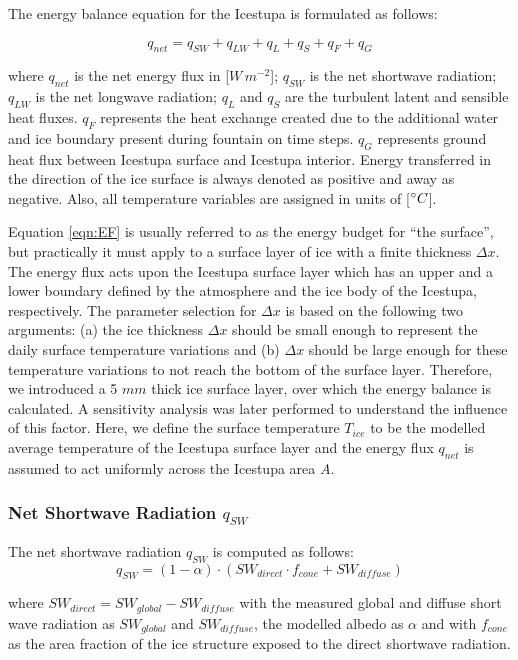 \documentclass[utf8]{frontiersSCNS} %
\begin{document}
The energy balance equation for the Icestupa is formulated as follows:

\begin{equation} q_{net} = q_{SW} + q_{LW} + q_{L} + q_{S} + q_{F} + q_{G} \label{eqn:EF} \end{equation}

where $q_{net}$ is the net energy flux in [$W\,m^{-2}$]; $q_{SW}$ is the net shortwave radiation; $q_{LW}$ is the net
longwave radiation; $q_{L}$ and $q_{S}$ are the turbulent latent and sensible heat fluxes. $q_{F}$ represents the heat
exchange created due to the additional water and ice boundary present during fountain on time steps. $q_{G}$
represents ground heat flux between Icestupa surface and Icestupa interior. Energy transferred in the direction of the
ice surface is always denoted as positive and away as negative. Also, all temperature variables are assigned in units
of [$\degree C$]. 

Equation \ref{eqn:EF} is usually referred to as the energy budget for “the surface”, but practically it must apply to
a surface layer of ice with a finite thickness $\Delta x$. The energy flux acts upon the Icestupa surface layer which
has an upper and a lower boundary defined by the atmosphere and the ice body of the Icestupa, respectively. The
parameter selection for $\Delta x$ is based on the following two arguments: (a) the ice thickness $\Delta x$ should be
small enough to represent the daily surface temperature variations and (b) $\Delta x$ should be large enough for these
temperature variations to not reach the bottom of the surface layer.  Therefore, we introduced a 5 $mm$ thick ice
surface layer, over which the energy balance is calculated. A sensitivity analysis was later performed to understand
the influence of this factor. Here, we define the surface temperature $T_{ice}$ to be the modelled average temperature
of the Icestupa surface layer and the energy flux $q_{net}$ is assumed to act uniformly across the Icestupa area $A$.

\subsubsection{Net Shortwave Radiation $q_{SW}$} The net shortwave radiation $q_{SW}$ is computed as follows:
\begin{equation} q_{SW} = (1- \alpha)\cdot (SW_{direct} \cdot f_{cone} + SW_{diffuse}) \label{eqn:SW} \end{equation}

where $SW_{direct} = SW_{global} - SW_{diffuse}$ with the measured global and diffuse short wave radiation as
$SW_{global}$ and $SW_{diffuse}$, the modelled albedo as $\alpha$ and with $f_{cone}$ as the area fraction of the ice
structure exposed to the direct shortwave radiation.
\end{document}
